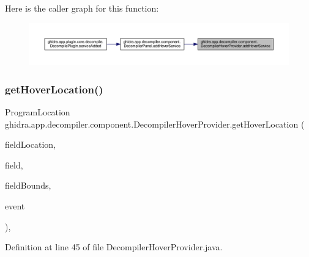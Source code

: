 Here is the caller graph for this function\+:
\nopagebreak
\begin{figure}[H]
\begin{center}
\leavevmode
\includegraphics[width=350pt]{classghidra_1_1app_1_1decompiler_1_1component_1_1_decompiler_hover_provider_ae6dca6081c1cbae2e5e08ff06aa4d7d9_icgraph}
\end{center}
\end{figure}
\mbox{\label{classghidra_1_1app_1_1decompiler_1_1component_1_1_decompiler_hover_provider_a204f03a4c27026245c4a1cd3094616b7}} 
\subsubsection{\texorpdfstring{getHoverLocation()}{getHoverLocation()}}
{\footnotesize\ttfamily Program\+Location ghidra.\+app.\+decompiler.\+component.\+Decompiler\+Hover\+Provider.\+get\+Hover\+Location (\begin{DoxyParamCaption}\item[{Field\+Location}]{field\+Location,  }\item[{Field}]{field,  }\item[{Rectangle}]{field\+Bounds,  }\item[{Mouse\+Event}]{event }\end{DoxyParamCaption})\hspace{0.3cm}{\ttfamily [inline]}, {\ttfamily [protected]}}



Definition at line 45 of file Decompiler\+Hover\+Provider.\+java.

